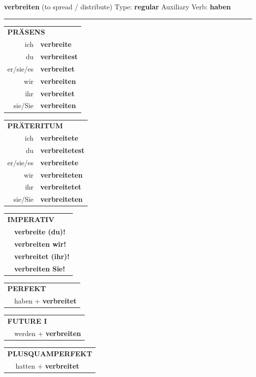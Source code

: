 \documentclass[10pt,a4paper]{revtex4-2}
\begin{document}
\begin{verbbox}
{\Large \bf verbreiten} (to spread / distribute) \hfill Type: \textbf{regular} \hfill Auxiliary Verb: \textbf{haben}

\vspace{5pt}
\hrule
\vspace{5pt}

\begin{tabular}{rl}
\multicolumn{2}{l}{\textbf{PRÄSENS}}\\
ich & \textbf{verbreite}\\
du & \textbf{verbreitest}\\
er/sie/es & \textbf{verbreitet}\\
wir & \textbf{verbreiten}\\
ihr & \textbf{verbreitet}\\
sie/Sie & \textbf{verbreiten}\\
\end{tabular}
\hfill
\begin{tabular}{rl}
\multicolumn{2}{l}{\textbf{PRÄTERITUM}}\\
ich & \textbf{verbreitete}\\
du & \textbf{verbreitetest}\\
er/sie/es & \textbf{verbreitete}\\
wir & \textbf{verbreiteten}\\
ihr & \textbf{verbreitetet}\\
sie/Sie & \textbf{verbreiteten}\\
\end{tabular}
\hfill
\begin{tabular}{rl}
\multicolumn{2}{l}{\textbf{IMPERATIV}}\\
& \textbf{verbreite (du)!}\\
& \textbf{verbreiten wir!}\\
& \textbf{verbreitet (ihr)!}\\
& \textbf{verbreiten Sie!}\\
\end{tabular}

\vspace{10pt}

\begin{tabular}{rl}
\multicolumn{2}{l}{\textbf{PERFEKT}}\\
& haben + \textbf{verbreitet}\\
\end{tabular}
\hfill
\begin{tabular}{rl}
\multicolumn{2}{l}{\textbf{FUTURE I}}\\
& werden + \textbf{verbreiten}\\
\end{tabular}
\hfill
\begin{tabular}{rl}
\multicolumn{2}{l}{\textbf{PLUSQUAMPERFEKT}}\\
& hatten + \textbf{verbreitet}\\
\end{tabular}


\end{verbbox}
\end{document}
